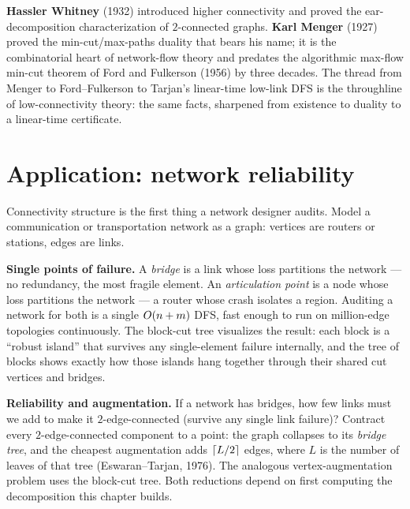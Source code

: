 \begin{historybox}
\textbf{Hassler Whitney} (1932) introduced higher connectivity and proved the
ear-decomposition characterization of $2$-connected graphs. \textbf{Karl Menger}
(1927) proved the min-cut/max-paths duality that bears his name; it is the
combinatorial heart of network-flow theory and predates the algorithmic max-flow
min-cut theorem of Ford and Fulkerson (1956) by three decades. The thread from Menger
to Ford--Fulkerson to Tarjan's linear-time low-link DFS is the throughline of
low-connectivity theory: the same facts, sharpened from existence to duality to a
linear-time certificate.
\end{historybox}

\section{Application: network reliability}
\label{ch10:reliability}

Connectivity structure is the first thing a network designer audits. Model a
communication or transportation network as a graph: vertices are routers or stations,
edges are links.

\begin{applicationbox}
\textbf{Single points of failure.} A \emph{bridge} is a link whose loss partitions the
network --- no redundancy, the most fragile element. An \emph{articulation point} is a
node whose loss partitions the network --- a router whose crash isolates a region.
Auditing a network for both is a single $O(n+m)$ DFS, fast enough to run on
million-edge topologies continuously. The block-cut tree visualizes the result: each
block is a ``robust island'' that survives any single-element failure internally, and
the tree of blocks shows exactly how those islands hang together through their shared
cut vertices and bridges.
\end{applicationbox}

\begin{applicationbox}
\textbf{Reliability and augmentation.} If a network has bridges, how few links must we
add to make it $2$-edge-connected (survive any single link failure)? Contract every
$2$-edge-connected component to a point: the graph collapses to its \emph{bridge tree},
and the cheapest augmentation adds $\lceil L/2\rceil$ edges, where $L$ is the number of
leaves of that tree (Eswaran--Tarjan, 1976). The analogous vertex-augmentation problem
uses the block-cut tree. Both reductions depend on first computing the decomposition
this chapter builds.
\end{applicationbox}

